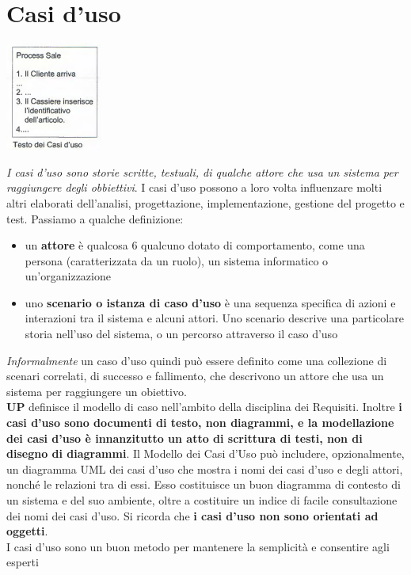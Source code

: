 \documentclass[a4paper,12pt, oneside]{book}
\begin{document}
\chapter{Casi d'uso}
\begin{center}
	\includegraphics[scale=0.7]{img/casdi.png}
\end{center}
\textit{I casi d'uso sono storie scritte, testuali, di qualche attore che usa un sistema per raggiungere degli obbiettivi}. I casi d'uso possono a loro volta influenzare molti altri elaborati dell'analisi, progettazione, implementazione, gestione del progetto e test. Passiamo a qualche definizione:
\begin{itemize}
	\item un \textbf{attore} è qualcosa 6 qualcuno dotato di
		comportamento, come una persona (caratterizzata da un ruolo), un sistema informatico o un'organizzazione
	\item uno \textbf{scenario o istanza di caso d'uso} è una sequenza specifica di azioni e interazioni
		  tra il sistema e alcuni attori. Uno scenario descrive una particolare storia nell'uso del sistema, o un percorso attraverso il caso d'uso
\end{itemize}
\textit{Informalmente }un caso d'uso quindi può essere definito come una collezione di scenari correlati, di successo e fallimento, che descrivono un attore che usa un sistema per raggiungere un obiettivo.\\
\textbf{UP} definisce il modello di caso nell'ambito della disciplina dei Requisiti. Inoltre \textbf{i casi d'uso sono documenti di testo, non diagrammi, e la modellazione dei casi
d'uso è innanzitutto un atto di scrittura di testi, non di disegno di diagrammi}. Il Modello dei Casi d'Uso può includere, opzionalmente, un diagramma UML dei casi
d'uso che mostra i nomi dei casi d'uso e degli attori, nonché le relazioni tra di essi. Esso costituisce un buon diagramma di contesto di un sistema e del suo ambiente, oltre a
costituire un indice di facile consultazione dei nomi dei casi d'uso. Si ricorda che \textbf{i casi d'uso non sono orientati ad oggetti}.\\
I casi d'uso sono un buon metodo per mantenere la semplicità e consentire agli esperti
\end{document}
